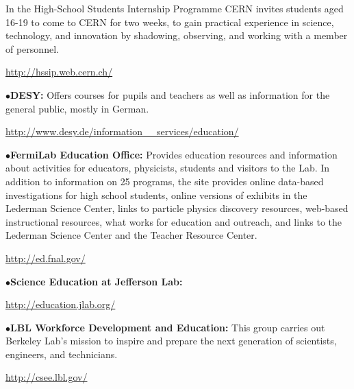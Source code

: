 In the High-School Students Internship Programme CERN invites students aged 16-19 to come to CERN for two weeks, to gain practical experience in science, technology, and innovation by shadowing, observing, and working with a member of personnel.
	\item{}\qquad\url{http://hssip.web.cern.ch/}

\smallskip

\item{$\bullet$}{\bf DESY:}
Offers courses for pupils and teachers as well as information for the general public, mostly in German.
	\item{}\qquad\url{http://www.desy.de/information\_\_services/education/}

\smallskip

\item{$\bullet$}{\bf FermiLab Education Office:} 
Provides  education resources and information about activities for educators, physicists, students and visitors to the Lab. In addition to information on 25 programs, the site  provides online data-based investigations for high school students, online versions of exhibits in the Lederman Science Center, links to particle physics discovery resources, web-based instructional resources, what works for education and outreach, and links to the Lederman Science Center and the Teacher Resource Center.
	\item{}\qquad\url{http://ed.fnal.gov/}

\smallskip

\item{$\bullet$}{\bf Science Education at Jefferson Lab:} 
	\item{}\qquad\url{http://education.jlab.org/}

\smallskip

\item{$\bullet$}{\bf LBL Workforce Development and Education:} 
This group carries out Berkeley Lab’s mission to inspire and prepare the next generation of scientists, engineers, and technicians.
	\item{}\qquad\url{http://csee.lbl.gov/}

\medskip


\medskip



\medskip



